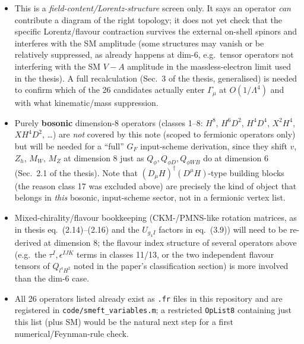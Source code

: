 \documentclass[11pt,a4paper]{article}
\newcommand{\Q}[1]{Q_{#1}}
\begin{document}
\begin{itemize}
\item This is a \emph{field-content/Lorentz-structure} screen only. It says
  an operator \emph{can} contribute a diagram of the right topology; it
  does not yet check that the specific Lorentz/flavour contraction survives
  the external on-shell spinors and interferes with the SM amplitude (some
  structures may vanish or be relatively suppressed, as already happens at
  dim-6, e.g.\ tensor operators not interfering with the SM $V-A$ amplitude
  in the massless-electron limit used in the thesis). A full recalculation
  (Sec.~3 of the thesis, generalised) is needed to confirm which of the 26
  candidates actually enter $\Gamma_\mu$ at $O(1/\Lambda^4)$ and with what
  kinematic/mass suppression.
\item Purely \textbf{bosonic} dimension-8 operators (classes 1--8: $H^8$,
  $H^6D^2$, $H^4D^4$, $X^2H^4$, $XH^4D^2$, \ldots) are \emph{not} covered by
  this note (scoped to fermionic operators only) but will be needed for a
  ``full'' $G_F$ input-scheme derivation, since they shift $v$, $Z_h$,
  $M_W$, $M_Z$ at dimension 8 just as $\Q\phi, \Q{\phi D}, \Q{\phi WB}$ do
  at dimension 6 (Sec.~2.1 of the thesis). Note that $(D_\mu H)^\dagger
  (D^\mu H)$-type building blocks (the reason class 17 was excluded above)
  are precisely the kind of object that belongs in \emph{this} bosonic,
  input-scheme sector, not in a fermionic vertex list.
\item Mixed-chirality/flavour bookkeeping (CKM-/PMNS-like rotation
  matrices, as in thesis eq.~(2.14)--(2.16) and the $U_{g_4I}$ factors in
  eq.~(3.9)) will need to be re-derived at dimension 8; the flavour
  index structure of several operators above (e.g.\ the $\tau^I,
  \epsilon^{IJK}$ terms in classes 11/13, or the two independent flavour
  tensors of $\Q{l^4H^2}$ noted in the paper's classification section) is
  more involved than the dim-6 case.
\item All 26 operators listed already exist as \texttt{.fr} files in this
  repository and are registered in \texttt{code/smeft\_variables.m}; a
  restricted \texttt{OpList8} containing just this list (plus SM) would be
  the natural next step for a first numerical/Feynman-rule check.
\end{itemize}
\end{document}
